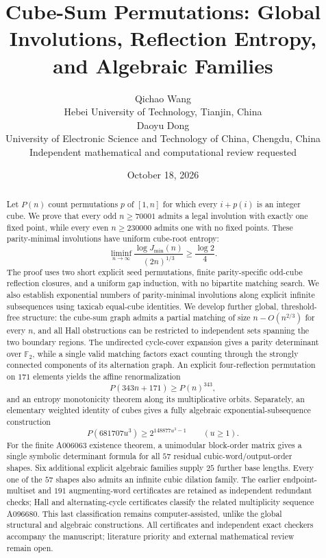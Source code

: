 \documentclass[10pt]{article}
\title{Cube-Sum Permutations: Global Involutions, Reflection Entropy, and Algebraic Families}
\author{Qichao Wang\\{\small Hebei University of Technology, Tianjin, China}\\[0.4em]Daoyu Dong\\{\small University of Electronic Science and Technology of China, Chengdu, China}\\[0.4em]{\small Independent mathematical and computational review requested}}
\date{October 18, 2026}
\begin{document}
\maketitle
\begin{abstract}
Let $P(n)$ count permutations $p$ of $[1,n]$
for which every $i+p(i)$ is an integer cube.
We prove that every odd $n\ge70001$ admits
a legal involution with exactly one fixed
point, while every even $n\ge230000$
admits one with no fixed points.
These parity-minimal involutions have
uniform cube-root entropy:
\[
\liminf_{n\to\infty}
\frac{\log J_{\min}(n)}{(2n)^{1/3}}
\ge\frac{\log2}{4}.
\]
The proof uses two short explicit
seed permutations, finite parity-specific
odd-cube reflection closures, and a
uniform gap induction, with no
bipartite matching search.
We also establish exponential numbers
of parity-minimal involutions along
explicit infinite subsequences
using taxicab equal-cube identities.
We develop further global, threshold-free structure:
the cube-sum graph admits a partial matching
of size $n-O(n^{2/3})$ for every $n$,
and all Hall obstructions can be restricted
to independent sets spanning the two
boundary regions. The undirected cycle-cover
expansion gives a parity determinant over
$\mathbb F_2$, while a single valid matching
factors exact counting through the strongly
connected components of its alternation graph.
An explicit four-reflection permutation
on $171$ elements yields the affine
renormalization
\[
P(343n+171)\ge P(n)^{343},
\]
and an entropy monotonicity theorem along
its multiplicative orbits.
Separately, an elementary weighted identity
of cubes gives a fully algebraic
exponential-subsequence construction
\[
P(681707u^3)\ge2^{148877u^3-1}
\qquad(u\ge1).
\]
For the finite A006063 existence theorem, a
unimodular block-order matrix gives a
single symbolic determinant formula for
all $57$ residual cubic-word/output-order
shapes. Six additional explicit algebraic
families supply $25$ further base lengths.
Every one of the $57$ shapes also admits an
infinite cubic dilation family.
The earlier endpoint-multiset and $191$
augmenting-word certificates are retained
as independent redundant checks;
Hall and
alternating-cycle certificates classify
the related multiplicity sequence A096680.
This last classification remains
computer-assisted, unlike the global
structural and algebraic constructions.
All certificates and independent exact
checkers accompany the manuscript;
literature priority and external
mathematical review remain open.
\end{abstract}
\end{document}
